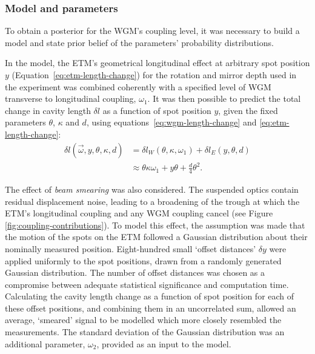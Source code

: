 \subsubsection{Model and parameters}
To obtain a posterior for the \gls{WGM}'s coupling level, it was necessary to build a model and state prior belief of the parameters' probability distributions.

In the model, the \gls{ETM}'s geometrical longitudinal effect at arbitrary spot position $y$ (Equation~\ref{eq:etm-length-change}) for the rotation and mirror depth used in the experiment was combined coherently with a specified level of \gls{WGM} transverse to longitudinal coupling, $\omega_1$. It was then possible to predict the total change in cavity length $\delta l$ as a function of spot position $y$, given the fixed parameters $\theta$, $\kappa$ and $d$, using equations~\ref{eq:wgm-length-change} and \ref{eq:etm-length-change}:
\begin{equation}
  \begin{split}
    \delta l \left( \vec{\omega}, y, \theta, \kappa, d \right) & = \delta l_W \left( \theta, \kappa, \omega_1 \right) + \delta l_E \left( y, \theta, d \right) \\
    & \approx \theta \kappa \omega_1 + y \theta + \frac{d}{4} \theta^2.
  \end{split}
\end{equation}

The effect of \emph{beam smearing} was also considered. The suspended optics contain residual displacement noise, leading to a broadening of the trough at which the \gls{ETM}'s longitudinal coupling and any \gls{WGM} coupling cancel (see Figure\,\ref{fig:coupling-contributions}). To model this effect, the assumption was made that the motion of the spots on the \gls{ETM} followed a Gaussian distribution about their nominally measured position. Eight-hundred small `offset distances' $\delta y$ were applied uniformly to the spot positions, drawn from a randomly generated Gaussian distribution. The number of offset distances was chosen as a compromise between adequate statistical significance and computation time. Calculating the cavity length change as a function of spot position for each of these offset positions, and combining them in an uncorrelated sum, allowed an average, `smeared' signal to be modelled which more closely resembled the measurements. The standard deviation of the Gaussian distribution was an additional parameter, $\omega_2$, provided as an input to the model.

